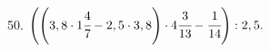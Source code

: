50. $\left(\left(3,8\cdot1\cfrac{4}{7}-2,5\cdot3,8\right)\cdot4\cfrac{3}{13}-\cfrac{1}{14}\right):2,5.$\quad
